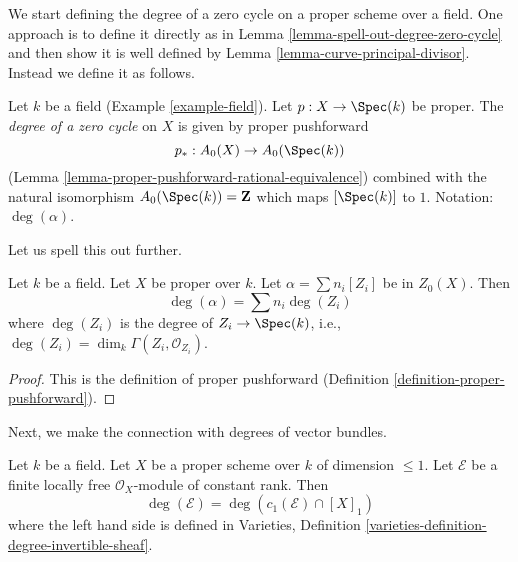 \noindent
We start defining the degree of a zero cycle on a proper scheme over a field.
One approach is to define it directly as in
Lemma \ref{lemma-spell-out-degree-zero-cycle} and then show
it is well defined by
Lemma \ref{lemma-curve-principal-divisor}.
Instead we define it as follows.

\begin{definition}
\label{definition-degree-zero-cycle}
Let $k$ be a field (Example \ref{example-field}). Let $p : X \to \Spec(k)$
be proper. The {\it degree of a zero cycle} on $X$ is given by proper
pushforward
$$
p_* : A_0(X) \to A_0(\Spec(k))
$$
(Lemma \ref{lemma-proper-pushforward-rational-equivalence})
combined with the natural isomorphism $A_0(\Spec(k)) = \mathbf{Z}$
which maps $[\Spec(k)]$ to $1$. Notation: $\deg(\alpha)$.
\end{definition}

\noindent
Let us spell this out further.

\begin{lemma}
\label{lemma-spell-out-degree-zero-cycle}
Let $k$ be a field. Let $X$ be proper over $k$. Let $\alpha = \sum n_i[Z_i]$
be in $Z_0(X)$. Then
$$
\deg(\alpha) = \sum n_i\deg(Z_i)
$$
where $\deg(Z_i)$ is the degree of $Z_i \to \Spec(k)$, i.e.,
$\deg(Z_i) = \dim_k \Gamma(Z_i, \mathcal{O}_{Z_i})$.
\end{lemma}

\begin{proof}
This is the definition of proper pushforward
(Definition \ref{definition-proper-pushforward}).
\end{proof}

\noindent
Next, we make the connection with degrees of vector bundles.

\begin{lemma}
\label{lemma-degree-vector-bundle}
Let $k$ be a field. Let $X$ be a proper scheme over $k$ of dimension $\leq 1$.
Let $\mathcal{E}$ be a finite locally free $\mathcal{O}_X$-module of constant
rank. Then
$$
\deg(\mathcal{E}) = \deg(c_1(\mathcal{E}) \cap [X]_1)
$$
where the left hand side is defined in
Varieties, Definition \ref{varieties-definition-degree-invertible-sheaf}.
\end{lemma}

